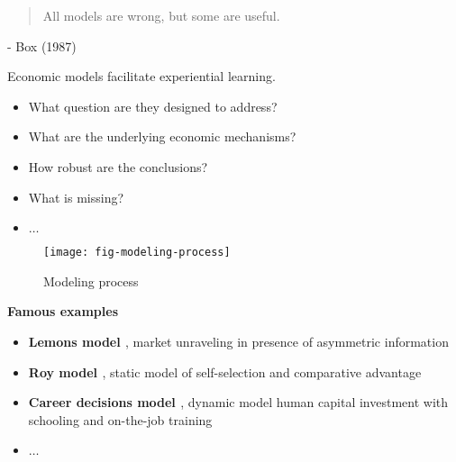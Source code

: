 \begin{frame}\begin{quote}
All models are wrong, but some are useful.
\end{quote}\vspace{-0.5pt} \hspace{6cm} - Box (1987)
\end{frame}
\begin{frame}
Economic models facilitate experiential learning.\vspace{0.3cm}
\begin{itemize}\setlength\itemsep{1em}
\item What question are they designed to address?
\item What are the underlying economic mechanisms?
\item How robust are the conclusions?
\item What is missing?
\item $\hdots$
\end{itemize}

\end{frame}
\begin{frame}
	\begin{figure}[htp]\centering
		\caption{Modeling process}\scalebox{0.35}
		{\texttt{[image: fig-modeling-process]}}
	\end{figure}
\end{frame}
\begin{frame}\textbf{Famous examples}\vspace{0.3cm}

\begin{itemize}\setlength\itemsep{1em}
\item \textbf{Lemons model \cite{Akerlof.1970}}, market unraveling in presence of asymmetric information
\item \textbf{Roy model \cite{Roy.1951}}, static model of self-selection and comparative advantage
\item \textbf{Career decisions model \cite{Keane.1997}}, dynamic model human capital investment with schooling and on-the-job training
\item $\hdots$
\end{itemize}

\end{frame}
